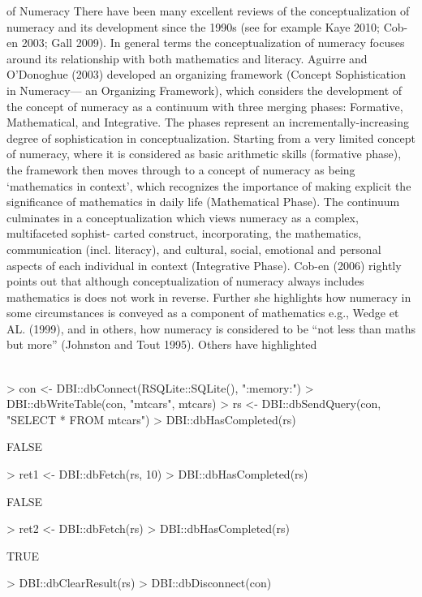 \documentclass{article}
\begin{document}
 of Numeracy
 There have been many excellent reviews of the conceptualization of numeracy
 and its development since the 1990s (see for example Kaye 2010; Cob-en 2003;
 Gall 2009). In general terms the conceptualization of numeracy focuses around its
 relationship with both mathematics and literacy. Aguirre and O’Donoghue (2003)
 developed an organizing framework (Concept Sophistication in Numeracy—
 an Organizing Framework), which considers the development of the concept of
 numeracy as a continuum with three merging phases: Formative, Mathematical,
 and Integrative. The phases represent an incrementally-increasing degree of
 sophistication in conceptualization. Starting from a very limited concept of
 numeracy, where it is considered as basic arithmetic skills (formative phase), the
 framework then moves through to a concept of numeracy as being ‘mathematics
 in context’, which recognizes the importance of making explicit the significance
 of mathematics in daily life (Mathematical Phase). The continuum culminates in
 a conceptualization which views numeracy as a complex, multifaceted sophist-
   carted construct, incorporating, the mathematics, communication (incl. literacy),
 and cultural, social, emotional and personal aspects of each individual in context
 (Integrative Phase).
 Cob-en (2006) rightly points out that although conceptualization of numeracy
 always includes mathematics is does not work in reverse. Further she highlights
 how numeracy in some circumstances is conveyed as a component of ­mathematics
 e.g., Wedge et AL. (1999), and in others, how numeracy is considered to be “not
 less than maths but more” (Johnston and Tout 1995). Others have highlighted
\textit{\\\\}
\begin{Schunk}
\begin{Sinput}
> con <- DBI::dbConnect(RSQLite::SQLite(), ":memory:")
> DBI::dbWriteTable(con, "mtcars", mtcars)
> rs <- DBI::dbSendQuery(con, "SELECT * FROM mtcars")
> DBI::dbHasCompleted(rs)
\end{Sinput}
\begin{Soutput}
[1] FALSE
\end{Soutput}
\begin{Sinput}
> ret1 <- DBI::dbFetch(rs, 10)
> DBI::dbHasCompleted(rs)
\end{Sinput}
\begin{Soutput}
[1] FALSE
\end{Soutput}
\begin{Sinput}
> ret2 <- DBI::dbFetch(rs)
> DBI::dbHasCompleted(rs)
\end{Sinput}
\begin{Soutput}
[1] TRUE
\end{Soutput}
\begin{Sinput}
> DBI::dbClearResult(rs)
> DBI::dbDisconnect(con)
\end{Sinput}
\end{Schunk}
\end{document}
